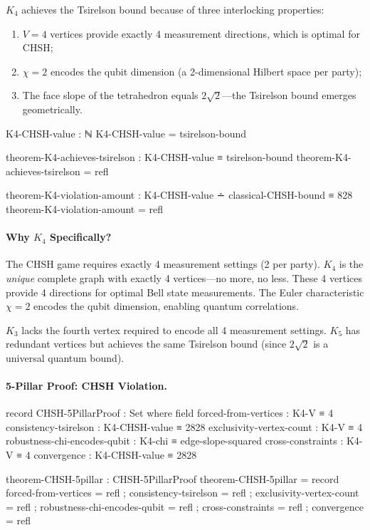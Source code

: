 \documentclass[11pt,a4paper]{book}
\begin{document}
$K_4$ achieves the Tsirelson bound because of three interlocking properties:
\begin{enumerate}
\item $V = 4$ vertices provide exactly 4 measurement directions, which is optimal for CHSH;
\item $\chi = 2$ encodes the qubit dimension (a 2-dimensional Hilbert space per party);
\item The face slope of the tetrahedron equals $2\sqrt{2}$---the Tsirelson bound emerges geometrically.
\end{enumerate}

\begin{code}
K4-CHSH-value : ℕ
K4-CHSH-value = tsirelson-bound

theorem-K4-achieves-tsirelson : K4-CHSH-value ≡ tsirelson-bound
theorem-K4-achieves-tsirelson = refl

theorem-K4-violation-amount : K4-CHSH-value ∸ classical-CHSH-bound ≡ 828
theorem-K4-violation-amount = refl

\end{code}

\paragraph{Why $K_4$ Specifically?}
The CHSH game requires exactly 4 measurement settings (2 per party).
$K_4$ is the \emph{unique} complete graph with exactly 4 vertices---no more, no less.
These 4 vertices provide 4 directions for optimal Bell state measurements.
The Euler characteristic $\chi = 2$ encodes the qubit dimension, enabling quantum correlations.

$K_3$ lacks the fourth vertex required to encode all 4 measurement settings.
$K_5$ has redundant vertices but achieves the same Tsirelson bound (since $2\sqrt{2}$ is a universal quantum bound).

\paragraph{5-Pillar Proof: CHSH Violation.}

\begin{code}
record CHSH-5PillarProof : Set where
  field
    forced-from-vertices : K4-V ≡ 4
    consistency-tsirelson : K4-CHSH-value ≡ 2828
    exclusivity-vertex-count : K4-V ≡ 4
    robustness-chi-encodes-qubit : K4-chi ≡ edge-slope-squared
    cross-constraints : K4-V ≡ 4
    convergence : K4-CHSH-value ≡ 2828

theorem-CHSH-5pillar : CHSH-5PillarProof
theorem-CHSH-5pillar = record
  { forced-from-vertices = refl
  ; consistency-tsirelson = refl
  ; exclusivity-vertex-count = refl
  ; robustness-chi-encodes-qubit = refl
  ; cross-constraints = refl
  ; convergence = refl
  }
\end{code}
\end{document}
